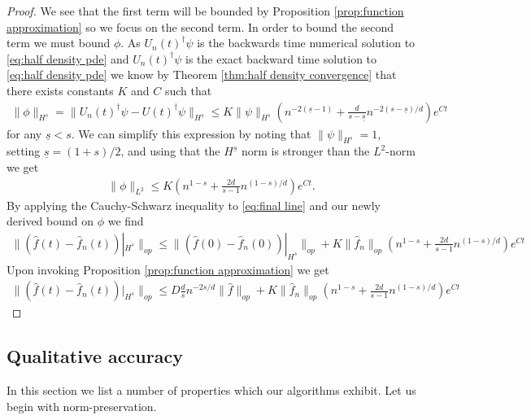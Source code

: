 \documentclass[final,leqno]{siamltex1213}
\begin{document}
\begin{proof}
	We see that the first term will be bounded by Proposition \ref{prop:function approximation} so we focus on the second term.
	In order to bound the second term we must bound $\phi$.
	As $U_{n}(t)^{\dagger} \psi$ is the backwards time numerical solution to \eqref{eq:half density pde}
	and $U_{n}(t)^{\dagger}\psi$ is the exact backward time solution to \eqref{eq:half density pde} we know by Theorem \ref{thm:half density convergence} that
	there exists constants $K$ and $C$ such that
	\begin{align}
		\| \phi \|_{H^{\underline{s}}} = \| U_{n}(t)^{\dagger} \psi - U(t)^{\dagger} \psi \|_{H^{\underline{s}}}  \leq K \| \psi \|_{H^{s}} \left(  n^{-2(\underline{s}-1)} + \frac{d}{s - \underline{s}} n^{-2(s-\underline{s})/d} \right) e^{Ct} 
	\end{align}
	for any $\underline{s} <s$.
	We can simplify this expression by noting that $\| \psi \|_{H^{s}} = 1$, setting $\underline{s} = (1+s)/2$, and using that the $H^{\underline{s}}$ norm is stronger than the $L^{2}$-norm we get
	\begin{align}
		 \| \phi \|_{L^{2}}  \leq  K \left(  n^{1-s} + \frac{2d}{s -1} n^{(1-s)/d} \right) e^{Ct}.
	\end{align}
	By applying the Cauchy-Schwarz inequality to \eqref{eq:final line} and our newly derived bound on $\phi$ we find
	\begin{align}
		\| ( \hat{f}(t) - \hat{f}_{n}(t))|_{H^{s}} \|_{op} \leq \| ( \hat{f}(0) - \hat{f}_{n}(0) )|_{H^{s}} \|_{op} +  K \| \hat{f}_{n} \|_{op} \left( n^{1-s} + \frac{2d}{s -1} n^{(1-s)/d} \right) e^{Ct}
	\end{align}
	Upon invoking Proposition \ref{prop:function approximation} we get
	\begin{align}
		\| ( \hat{f}(t) - \hat{f}_{n}(t))|_{H^{s}} \|_{op} \leq D \frac{d}{s} n^{-2s/d} \| \hat{f} \|_{op}+  K \| \hat{f}_{n} \|_{op} \left( n^{1-s} + \frac{2d}{s -1} n^{(1-s)/d} \right) e^{Ct}
	\end{align}
\end{proof}


\subsection{Qualitative accuracy}
In this section we list a number of properties which our algorithms exhibit.  Let us begin with norm-preservation.
\end{document}
